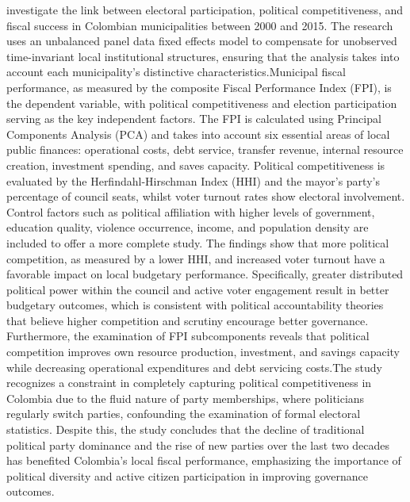   investigate the link between electoral participation, political competitiveness, and fiscal success in Colombian municipalities between 2000 and 2015. The research uses an unbalanced panel data fixed effects model to compensate for unobserved time-invariant local institutional structures, ensuring that the analysis takes into account each municipality's distinctive characteristics.Municipal fiscal performance, as measured by the composite Fiscal Performance Index (FPI), is the dependent variable, with political competitiveness and election participation serving as the key independent factors. The FPI is calculated using Principal Components Analysis (PCA) and takes into account six essential areas of local public finances: operational costs, debt service, transfer revenue, internal resource creation, investment spending, and saves capacity. Political competitiveness is evaluated by the Herfindahl-Hirschman Index (HHI) and the mayor's party's percentage of council seats, whilst voter turnout rates show electoral involvement. Control factors such as political affiliation with higher levels of government, education quality, violence occurrence, income, and population density are included to offer a more complete study. The findings show that more political competition, as measured by a lower HHI, and increased voter turnout have a favorable impact on local budgetary performance. Specifically, greater distributed political power within the council and active voter engagement result in better budgetary outcomes, which is consistent with political accountability theories that believe higher competition and scrutiny encourage better governance. Furthermore, the examination of FPI subcomponents reveals that political competition improves own resource production, investment, and savings capacity while decreasing operational expenditures and debt servicing costs.The study recognizes a constraint in completely capturing political competitiveness in Colombia due to the fluid nature of party memberships, where politicians regularly switch parties, confounding the examination of formal electoral statistics. Despite this, the study concludes that the decline of traditional political party dominance and the rise of new parties over the last two decades has benefited Colombia's local fiscal performance, emphasizing the importance of political diversity and active citizen participation in improving governance outcomes.\\
